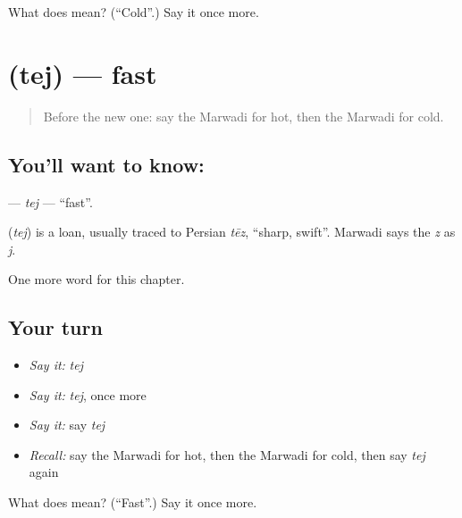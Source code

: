 \begin{tcolorbox}[breakable,colback=teal!4,colframe=teal!35!black,title={Before you move on}]
What does  mean? (\textquotedblleft{}Cold\textquotedblright{}.) Say it once more.
\end{tcolorbox}
\section[\texorpdfstring{\mw{तेज} (tej)}{तेज (tej)}]{ (tej) — fast}

\label{lesson:MW-C74-tej}



\begin{quote}
Before the new one: say the Marwadi for hot, then the Marwadi for cold.
\end{quote}

\subsection*{You'll want to know: }
\textbf{} — \emph{tej} — \textquotedblleft{}fast\textquotedblright{}.

\begin{cousinweb}
\textbf{} (\emph{tej}) is a loan, usually traced to Persian \emph{tēz}, \textquotedblleft{}sharp, swift\textquotedblright{}. Marwadi says the \emph{z} as \emph{j}.
\end{cousinweb}

\begin{grammarlens}[title={What you've built}]
One more word for this chapter.
\end{grammarlens}

\subsection*{Your turn}
\begin{itemize}
\raggedright
  \item \emph{Say it:} \emph{tej}
  \item \emph{Say it:} \emph{tej}, once more
  \item \emph{Say it:} say \emph{tej}
  \item \emph{Recall:} say the Marwadi for hot, then the Marwadi for cold, then say \emph{tej} again
\end{itemize}

\begin{tcolorbox}[breakable,colback=teal!4,colframe=teal!35!black,title={Before you move on}]
What does  mean? (\textquotedblleft{}Fast\textquotedblright{}.) Say it once more.
\end{tcolorbox}
